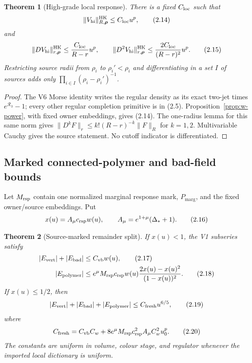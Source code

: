 \documentclass[11pt]{article}
\newtheorem{theorem}{Theorem}[section]
\theoremstyle{definition}
\theoremstyle{remark}
\newcommand{\Pm}{P_{\mathrm{marg}}}
\begin{document}
\begin{theorem}[High-grade local response]
\label{thm:local-response}
There is a fixed $C_{\rm loc}$ such that
\[
 \|V_{\rm hi}\|_{R,\boldsymbol\rho}^{\rm HK}
 \le C_{\rm loc}u^p,                                       \tag{2.14}
\]
and
\[
 \|DV_{\rm hi}\|_{r,\boldsymbol\rho}^{\rm HK}
 \le\frac{C_{\rm loc}}{R-r}u^p,\qquad
 \|D^2V_{\rm hi}\|_{r,\boldsymbol\rho}^{\rm HK}
 \le\frac{2C_{\rm loc}}{(R-r)^2}u^p.                      \tag{2.15}
\]
Restricting source radii from $\rho_i$ to $\rho_i'<\rho_i$ and
differentiating in a set $I$ of sources adds only
$\prod_{i\in I}(\rho_i-\rho_i')^{-1}$.
\end{theorem}

\begin{proof}
The V6 Morse identity writes the regular density as its exact two-jet times
$e^{\mathcal R_3}-1$; every other regular completion primitive is in
(2.5).  Proposition~\ref{prop:w-power}, with fixed owner embeddings, gives
(2.14).  The one-radius lemma for this same norm gives
$\|D^kF\|_r\le k!(R-r)^{-k}\|F\|_R$ for $k=1,2$.
Multivariable Cauchy gives the source statement.  No cutoff indicator is
differentiated.
\end{proof}

\subsection{Marked connected-polymer and bad-field bounds}

Let $M_{\rm rsp}$ contain one normalized marginal response mark, $\Pm$,
and the fixed owner/source embeddings.  Put
\[
 x(u)=A_\mu c_{\rm rsp}w(u),\qquad
 A_\mu=e^{1+\mu}(\Delta_*+1).                              \tag{2.16}
\]

\begin{theorem}[Source-marked remainder split]
\label{thm:marked-split}
If $x(u)<1$, the V1 subseries satisfy
\begin{align}
 |E_{\rm vert}|+|E_{\rm bad}|
 &\le C_{\rm vb}w(u),                                      \tag{2.17}\\
 |E_{\rm polymer}|
 &\le e^\mu M_{\rm rsp}c_{\rm rsp}w(u)
       \frac{2x(u)-x(u)^2}{(1-x(u))^2}.                     \tag{2.18}
\end{align}
If $x(u)\le1/2$, then
\[
 |E_{\rm vert}|+|E_{\rm bad}|+|E_{\rm polymer}|
 \le C_{\rm fresh}u^{6/5},                                \tag{2.19}
\]
where
\[
 C_{\rm fresh}=C_{\rm vb}C_w
 +8e^\mu M_{\rm rsp}c_{\rm rsp}^2A_\mu C_w^2u_0^p.       \tag{2.20}
\]
The constants are uniform in volume, colour stage, and regulator whenever the
imported local dictionary is uniform.
\end{theorem}
\end{document}
